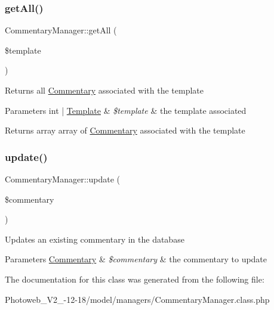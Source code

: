 \subsubsection{\texorpdfstring{get\+All()}{getAll()}}
{\footnotesize\ttfamily Commentary\+Manager\+::get\+All (\begin{DoxyParamCaption}\item[{}]{\$template }\end{DoxyParamCaption})}

Returns all \hyperlink{classCommentary}{Commentary} associated with the template 
\begin{DoxyParams}[1]{Parameters}
int | \hyperlink{classTemplate}{Template} & {\em \$template} & the template associated \\
\hline
\end{DoxyParams}
\begin{DoxyReturn}{Returns}
array array of \hyperlink{classCommentary}{Commentary} associated with the template 
\end{DoxyReturn}
\mbox{\label{classCommentaryManager_ab39757f295cbb8c81ca71d4c221fd0cf}} 
\subsubsection{\texorpdfstring{update()}{update()}}
{\footnotesize\ttfamily Commentary\+Manager\+::update (\begin{DoxyParamCaption}\item[{}]{\$commentary }\end{DoxyParamCaption})}

Updates an existing commentary in the database 
\begin{DoxyParams}[1]{Parameters}
\hyperlink{classCommentary}{Commentary} & {\em \$commentary} & the commentary to update \\
\hline
\end{DoxyParams}


The documentation for this class was generated from the following file\+:\begin{DoxyCompactItemize}
\item 
Photoweb\+\_\+\+V2\+\_-\/12-\/18/model/managers/Commentary\+Manager.\+class.\+php\end{DoxyCompactItemize}
